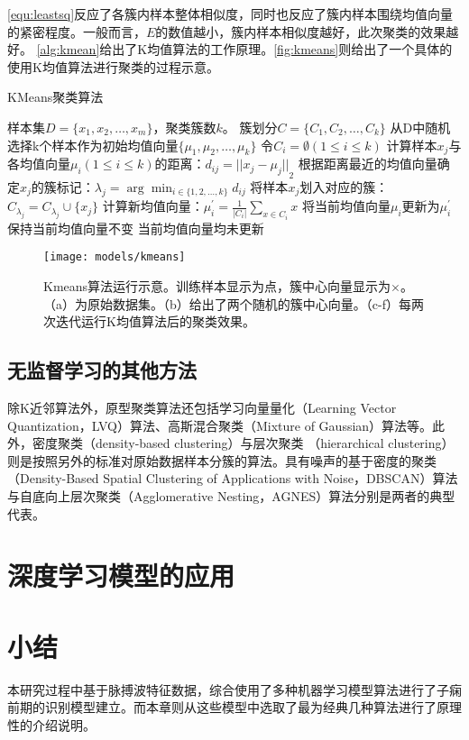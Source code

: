 \autoref{equ:leastsq}反应了各簇内样本整体相似度，同时也反应了簇内样本围绕均值向量的紧密程度。一般而言，$E$的数值越小，簇内样本相似度越好，此次聚类的效果越好。
\autoref{alg:kmean}给出了K均值算法的工作原理。\autoref{fig:kmeans}则给出了一个具体的使用K均值算法进行聚类的过程示意。
\begin{breakablealgorithm}
    \caption[KMeans聚类算法]{KMeans聚类算法\cite{Zhou2016}}
    \label{alg:kmean}
    \begin{algorithmic}[1] %
        \Require 样本集$D=\{x_1,x_2,\dots,x_m\}$，聚类簇数$k$。
        \Ensure 簇划分$C=\{C_1,C_2,\dots,C_k\}$
        \State 从D中随机选择k个样本作为初始均值向量$\{\mu_1,\mu_2,\dots,\mu_k\}$
        \Repeat
        \State 令$C_i=\emptyset (1\le i\le k)$
                \State 计算样本$x_j$与各均值向量$\mu_i (1\le i \le k)$的距离：$d_{ij}={||x_j - \mu_j||}_2$
                \State 根据距离最近的均值向量确定$x_j$的簇标记：$\lambda_j = \arg \min_{i \in \{1,2,\dots,k\}} d_{ij}$
                \State 将样本$x_j$划入对应的簇：$C_{\lambda_j} = C_{\lambda_j} \cup \{x_j\}$
            \EndFor
                \State 计算新均值向量：$\mu_i^{'}=\frac{1}{|C_i|} \sum_{x \in C_i}{x}$
                    \State 将当前均值向量$\mu_i$更新为$\mu_i^{'}$
                \Else
                    \State 保持当前均值向量不变
                \EndIf
            \EndFor
        \Until 当前均值向量均未更新
    \end{algorithmic}
\end{breakablealgorithm}
\begin{figure}[htbp]
    \centering
    \texttt{[image: models/kmeans]}
    \caption[Kmeans算法运行示意]{\label{fig:kmeans}Kmeans算法运行示意\cite{kmeans}。训练样本显示为点，簇中心向量显示为$\times$。（a）为原始数据集。（b）给出了两个随机的簇中心向量。（c-f）每两次迭代运行K均值算法后的聚类效果。}
\end{figure}

\subsection{无监督学习的其他方法}
除K近邻算法外，原型聚类算法还包括学习向量量化（Learning Vector Quantization，LVQ）算法、高斯混合聚类（Mixture of Gaussian）算法等。此外，密度聚类（density-based clustering）与层次聚类
（hierarchical clustering）则是按照另外的标准对原始数据样本分簇的算法。具有噪声的基于密度的聚类（Density-Based Spatial Clustering of Applications with Noise，DBSCAN）算法
与自底向上层次聚类（Agglomerative Nesting，AGNES）算法分别是两者的典型代表\cite{Zhou2016}。

\section{深度学习模型的应用}
\section{小结}
本研究过程中基于脉搏波特征数据，综合使用了多种机器学习模型算法进行了子痫前期的识别模型建立。而本章则从这些模型中选取了最为经典几种算法进行了原理性的介绍说明。
